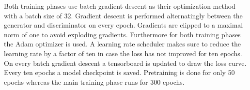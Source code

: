 Both training phases use batch gradient descent as their optimization method with a batch size of 32. Gradient descent is performed alternatingly between the generator and discriminator on every epoch. Gradients are clipped to a maximal norm of one to avoid exploding gradients. Furthermore for both training phases the Adam optimizer is used. A learning rate scheduler makes sure to reduce the learning rate by a factor of ten in case the loss has not improved for ten epochs. On every batch gradient descent a tensorboard is updated to draw the loss curve. Every ten epochs a model checkpoint is saved. Pretraining is done for only 50 epochs whereas the main training phase runs for 300 epochs. 


\newpage
